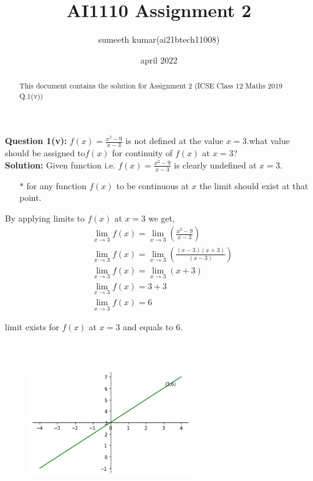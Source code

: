 \documentclass[journel,11pt,two column]{IEEEtran}
\title{AI1110 Assignment 2 }
\author{sumeeth kumar(ai21btech11008)}
\date{april 2022}
\begin{document}
\maketitle

\begin{abstract}
This document contains the solution for Assignment 2 (ICSE Class 12 Maths 2019 Q.1(v))

\end{abstract}

\textbf{Question 1(v):}\vspace{1.1mm}
$f(x)=\frac{x^2-9}{x-3}$ is not defined at the value $x=3$.what value should be assigned to$f(x)$ for continuity of $f(x)$ at $x=3$?\\

\textbf{Solution:}
Given function i.e. $f(x)=\frac{x^2-9}{x-3}$ is clearly undefined at $x=3$.\\

\begin{itemize}
    \item[$\ast$] for any function $f(x)$ to be continuous at $x$ the limit should exist at that point.\\
\end{itemize}
 By applying limits to $f(x)$ at $x=3$ we get,
 \\
 \begin{align}
 &{\lim_{x\to 3}f(x)=\lim_{x\to3}\left(\frac{x^2-9}{x-3}\right)}\\[8pt]
 &{\lim_{x\to 3}f(x)=\lim_{x\to3}\left(\frac{(x-3)(x+3)}{(x-3)}\right)}\\[8pt]
 &{\lim_{x\to 3}f(x)=\lim_{x\to3}(x+3)}\\[8pt]
 &{\lim_{x\to 3}f(x)=3+3}\\[8pt]
 &{\lim_{x\to 3}f(x)=6}
 \end{align}

 limit exists for $f(x)$ at $x=3$ and equals to 6.
\begin{figure}[h!]
    \centering
    \includegraphics[width=7cm,height = 7cm]{Assignment_2.png}
    
    \label{regeq}
\end{figure}
 
\end{document}
